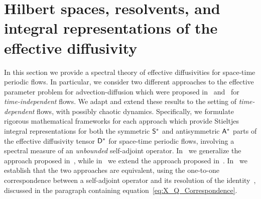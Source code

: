 \documentclass[amsa]{ipart}
\begin{document}
\section{Hilbert spaces, resolvents, and integral representations of the effective diffusivity}
\label{app:Hilbert_Resolvent_Integral_Reps} 
%
In this section we provide a spectral theory of effective
diffusivities for space-time periodic flows. In particular, we
consider two different approaches to the effective parameter problem
for advection-diffusion which were proposed
in~\cite{Pavliotis:PHD_Thesis,Bhattacharya:AAP:1999:951}   
and~\cite{Avellaneda:PRL-753,Avellaneda:CMP-339} for
\emph{time-independent} flows. We adapt and extend these results to the
setting of \emph{time-dependent} flows, with possibly chaotic
dynamics. Specifically, we 
formulate rigorous mathematical 
frameworks for each approach which provide Stieltjes integral
representations for both the symmetric $\mathsf{S}^*$ and antisymmetric
$\mathsf{A}^*$ parts of the effective diffusivity tensor $\mathsf{D}^*$ for
space-time periodic flows, involving a spectral measure of an
\emph{unbounded} self-adjoint operator. In~
we generalize the approach proposed
in~\cite{Pavliotis:PHD_Thesis}, 
while in~ we extend the approach
proposed
in~\cite{Avellaneda:PRL-753,Avellaneda:CMP-339}. In~
we establish that the two approaches are equivalent, using the
one-to-one correspondence between a self-adjoint operator and its
resolution of the identity~\cite{Stone:64}, discussed in the paragraph
containing equation~\eqref{eq:X_Q_Correspondence}.   
\end{document}
